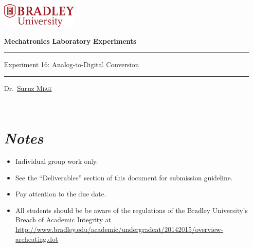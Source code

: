 \documentclass{article}
\def\labTitle{Experiment 16: Analog-to-Digital Conversion}
\newcommand{\midskip}[0]{\vspace{3mm}}
\begin{document}
\centerline{\href{http://www.bradley.edu}{\includegraphics[height=0.5in]{figs/logoBU1-Print}}}

\begin{center}
\vspace*{1.0cm}
{\bf \LARGE %
  Mechatronics Laboratory Experiments}



\vspace*{2.0cm}

{\color{BrickRed}
\hrule height 1.5pt
\midskip
}
{\LARGE %
\labTitle%
}\\
\midskip
{\color{BrickRed}
\hrule height 1.5pt
\midskip
}
\vspace*{0.15cm}
\begin{flushright}
{\Large
Dr.~\href{http://personalpages.bradley.edu/~smiah}{Suruz \textsc{Miah}}
}
\end{flushright}

\vspace*{1.0cm}
\noindent
~\hfill{}


\end{center}

\vspace*{1.0cm}
\section*{\textit{Notes}}
\begin{itemize}
\item Individual group work only. 
  
\item See the ``Deliverables'' section of this document for submission guideline. 

\item Pay attention to the due date. %
\item All students should be be aware of the regulations of the Bradley University's Breach of Academic Integrity at \url{http://www.bradley.edu/academic/undergradcat/20142015/overview-archeating.dot}
\end{itemize}
\end{document}
